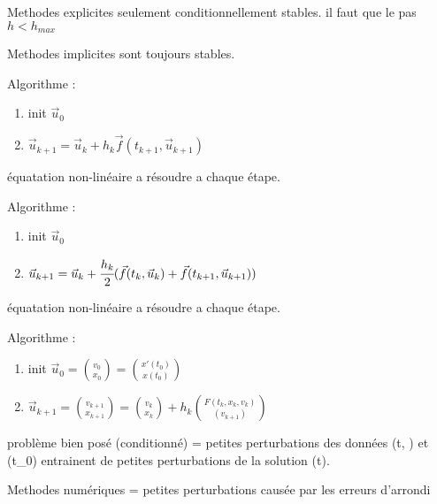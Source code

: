 
Methodes explicites seulement conditionnellement stables.
il faut que le pas $h < h_{max}$


Methodes implicites sont toujours stables.


Algorithme :

\begin{enumerate}
    \item init $\vec{u}_{0} $
    \item $\vec{u}_{k+1} = \vec{u}_{k} + h_k \vec{f}(t_{k+1}, \vec{u}_{k+1})$
\end{enumerate}
équatation non-linéaire a résoudre a chaque étape.


Algorithme :

\begin{enumerate}
    \item init $\vec{u}_{0} $
    \item $\vec{u}_{k+1} = \vec{u}_{k} + \cfrac{h_k}{2} (\vec{f}(t_{k}, \vec{u}_{k}) + \vec{f}(t_{k+1}, \vec{u}_{k+1}))$
\end{enumerate}
équatation non-linéaire a résoudre a chaque étape.


Algorithme :

\begin{enumerate}
    \item init $\vec{u}_{0} = \binom{v_0}{x_0} = \binom{x'(t_0)}{x(t_0)}$
    \item $\vec{u}_{k+1} = \binom{v_{k+1}}{x_{k+1}} = \binom{v_{k}}{x_{k}} + h_k \binom{F(t_k,x_k,v_k)}{(v_{k+1})}$
\end{enumerate}


problème bien posé (conditionné) = petites perturbations des données (t, ) et
(t_0) entrainent de petites perturbations de la solution (t).

Methodes numériques = petites perturbations causée par les erreurs d'arrondi
